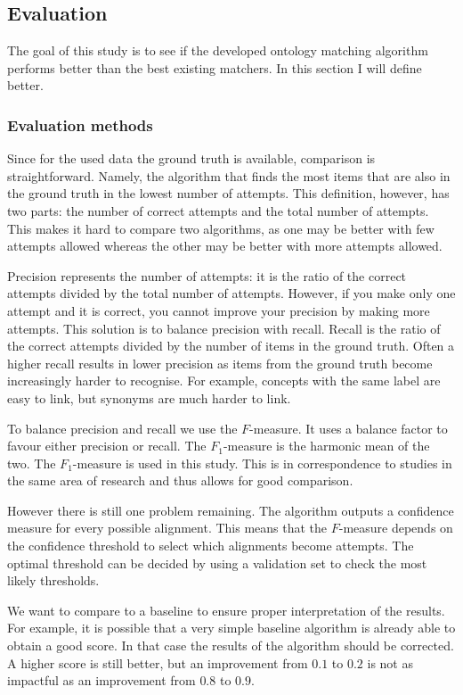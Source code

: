 \documentclass{article}
\begin{document}
 
 \newpage
 \subsection{Evaluation}
 The goal of this study is to see if the developed ontology matching algorithm performs better than the best existing matchers. In this section I will define better.
 \subsubsection{Evaluation methods} \label{EvaluationMethods}
 Since for the used data the ground truth is available, comparison is straightforward. Namely, the algorithm that finds the most items that are also in the ground truth in the lowest number of attempts. This definition, however, has two parts: the number of correct attempts and the total number of attempts. This makes it hard to compare two algorithms, as one may be better with few attempts allowed whereas the other may be better with more attempts allowed.
 
 Precision represents the number of attempts: it is the ratio of the correct attempts divided by the total number of attempts. However, if you make only one attempt and it is correct, you cannot improve your precision by making more attempts. This solution is to balance precision with recall. Recall is the ratio of the correct attempts divided by the number of items in the ground truth. Often a higher recall results in lower precision as items from the ground truth become increasingly harder to recognise. For example, concepts with the same label are easy to link, but synonyms are much harder to link. 
 
 To balance precision and recall we use the $F$-measure. It uses a balance factor to favour either precision or recall. The $F_1$-measure is the harmonic mean of the two. The $F_1$-measure is used in this study. This is in correspondence to studies in the same area of research and thus allows for good comparison.
 
 However there is still one problem remaining. The algorithm outputs a confidence measure for every possible alignment. This means that the $F$-measure depends on the confidence threshold to select which alignments become attempts. The optimal threshold can be decided by using a validation set to check the most likely thresholds.
 
 We want to compare to a baseline to ensure proper interpretation of the results. For example, it is possible that a very simple baseline algorithm is already able to obtain a good score. In that case the results of the algorithm should be corrected. A higher score is still better, but an improvement from $0.1$ to $0.2$ is not as impactful as an improvement from $0.8$ to $0.9$. 
 
\end{document}
